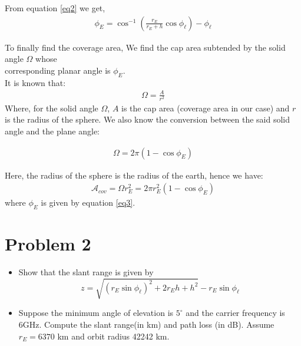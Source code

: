 \documentclass[titlepage]{article}
\begin{document}
\noindent From equation \ref{eq2} we get,
\begin{align}
    \phi_E = \cos ^{-1} \left(\frac{r_E}{r_E+h}\cos \phi_{\ell}\right)-\phi_{\ell} \label{eq3}
\end{align}

\noindent To finally find the coverage area, We find the cap area subtended by the solid angle $\Omega$ whose \\corresponding planar angle is $\phi_E$.\\
It is known that:
\begin{align}
    \Omega = \frac{A}{r^2} \label{eq4}
\end{align}
Where, for the solid angle $\Omega$, $A$ is the cap area (coverage area in our case) and $r$ is the radius of the sphere. We also know the conversion between the said solid angle and the plane angle:

\begin{align}
    \Omega = 2\pi (1-\cos\phi_E) \label{eq5}
\end{align}

\noindent Here, the radius of the sphere is the radius of the earth, hence we have:
\begin{align}
    \boxed{\mathcal{A}_{cov} = \Omega r_E^2 = 2\pi r_E^2(1-\cos\phi_E)} \label{eq6}
\end{align}
where $\phi_E$ is given by equation \ref{eq3}.

\newpage

\section {Problem 2}

\begin{tcolorbox}
    \begin{itemize}
        \item Show that the slant range is given by $$z = \sqrt{(r_E\sin \phi_{\ell})^2+2r_Eh+h^2}-r_E\sin\phi_{\ell}$$
        \item Suppose the minimum angle of elevation is $5^{\circ}$ and the carrier frequency is 6GHz. Compute the slant range(in km) and path loss (in dB). Assume $r_E = 6370 $ km and orbit radius 42242 km.
    \end{itemize}
\end{tcolorbox}
\end{document}
